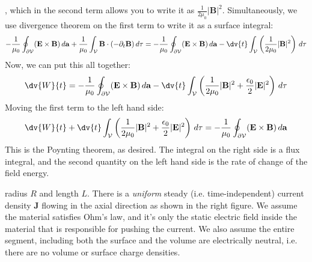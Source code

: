 \documentclass[10pt]{article}
\begin{document}
\begin{enumerate}[label=(\alph*)]
\begin{solution}
				 \), which in the second term allows you to write it as \( \frac{1}{2\mu_0}|\mathbf{B}|^2 \).
				Simultaneously, we use divergence theorem on the first term to write it as a surface integral:  
				\[
					-\frac{1}{\mu_0} \oint_{\partial \mathcal{V}}(\mathbf{E} \times \mathbf{B}) \diff \mathbf{a} +
					\frac{1}{\mu_0} \int_{\mathcal{V}} \mathbf{B} \cdot (-\partial_t \mathbf{B}) \diff \tau =
					-\frac{1}{\mu_0}\oint_{\partial \mathcal{ V}}(\mathbf{E} \times \mathbf{B}) \diff \mathbf{a} - \dv{t}
					\int_{\mathcal{V}}\left( \frac{1}{2\mu_0} |\mathbf{B}|^2\right) \diff \tau 
				\]
				Now, we can put this all together:
				\[
					\dv{W}{t} = -\frac{1}{\mu_0} \oint_{\partial \mathcal{V}} (\mathbf{E} \times \mathbf{B}) \diff
					\mathbf{a} - \dv{t} \int_{\mathcal{V}}\left( \frac{1}{2\mu_0}|\mathbf{B}|^2 +
					\frac{\epsilon_0}{2}|\mathbf{E}|^2 \right) \diff \tau 
				\]
				Moving the first term to the left hand side:
				\[
					\dv{W}{t} + \dv{t} \int_{\mathcal{V}}\left( \frac{1}{2\mu_0}|\mathbf{B}|^2 +
					\frac{\epsilon_0}{2}|\mathbf{E}|^2 \right)\diff \tau = -\frac{1}{\mu_0}\oint_{\partial
					\mathcal{V}}(\mathbf{E} \times \mathbf{B}) \diff \mathbf{a}
				\]
				This is the Poynting theorem, as desired. The integral on the right side is a flux integral,
				and the second quantity on the left hand side is the rate of change of the field energy.
			\end{solution}
	\end{enumerate}
	radius \( R \) and length \( L \). There is a \textit{uniform} steady (i.e. time-independent) current
	density \( \mathbf{J} \) flowing in the axial direction as shown in the right figure. We assume the
	material satisfies Ohm's law, and it's only the static electric field inside the material that is
	responsible for pushing the current. We also assume the entire segment, including both the surface and
	the volume are electrically neutral, i.e. there are no volume or surface charge densities.
	\begin{center}
	\end{center}
\end{document}
